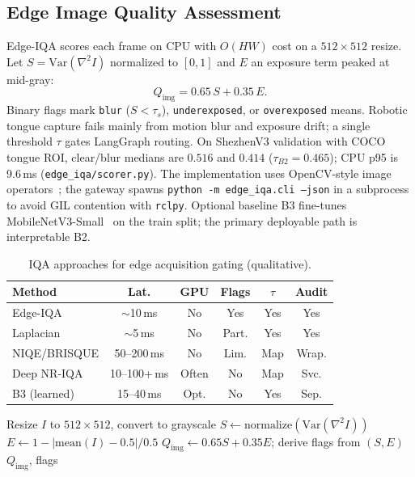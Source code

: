 \subsection{Edge Image Quality Assessment}
\label{sec:edge-iqa}

Edge-IQA scores each frame on CPU with $O(HW)$ cost on a $512\times512$ resize.
Let $S=\mathrm{Var}(\nabla^2 I)$ normalized to $[0,1]$ and $E$ an exposure term peaked at mid-gray:
\begin{equation}
Q_{\mathrm{img}} = 0.65\, S + 0.35\, E .
\end{equation}
Binary flags mark \texttt{blur} ($S<\tau_s$), \texttt{underexposed}, or \texttt{overexposed} means.
Robotic tongue capture fails mainly from motion blur and exposure drift; a single threshold $\tau$ gates LangGraph routing.
On ShezhenV3 validation with COCO tongue ROI, clear/blur medians are $0.516$ and $0.414$ ($\tau_{B2}{=}0.465$); CPU p95 is 9.6\,ms (\texttt{edge\_iqa/scorer.py}).
The implementation uses OpenCV-style image operators~\cite{opencv2020}; the gateway spawns \texttt{python -m edge\_iqa.cli --json} in a subprocess to avoid GIL contention with \texttt{rclpy}.
Optional baseline B3 fine-tunes MobileNetV3-Small~\cite{howard2019mobilenetv3} on the train split; the primary deployable path is interpretable B2.

\begin{table}[!t]
\centering
\caption{IQA approaches for edge acquisition gating (qualitative).}
\label{tab:iqa-compare}
\small
\setlength{\tabcolsep}{3pt}
\begin{tabular}{lccccc}
\hline
Method & Lat. & GPU & Flags & $\tau$ & Audit \\
\hline
Edge-IQA & $\sim$10\,ms & No & Yes & Yes & Yes \\
Laplacian & $\sim$5\,ms & No & Part. & Yes & Yes \\
NIQE/BRISQUE & 50--200\,ms & No & Lim. & Map & Wrap. \\
Deep NR-IQA & 10--100+\,ms & Often & No & Map & Svc. \\
B3 (learned) & 15--40\,ms & Opt. & No & Yes & Sep. \\
\hline
\end{tabular}
\end{table}

\begin{algorithm}[!t]
\caption{Edge-IQA scoring}
\label{alg:edge-iqa}
\begin{algorithmic}[1]
\STATE Resize $I$ to $512\times512$, convert to grayscale
\STATE $S \leftarrow \mathrm{normalize}(\mathrm{Var}(\nabla^2 I))$
\STATE $E \leftarrow 1 - | \mathrm{mean}(I) - 0.5 | / 0.5$
\STATE $Q_{\mathrm{img}} \leftarrow 0.65 S + 0.35 E$; derive flags from $(S,E)$
\STATE \RETURN $Q_{\mathrm{img}}$, flags
\end{algorithmic}
\end{algorithm}

